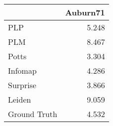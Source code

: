 \begin{tabular}{lr}
\toprule
{} & Auburn71 \\
\midrule
PLP          &    5.248 \\
PLM          &    8.467 \\
Potts        &    3.304 \\
Infomap      &    4.286 \\
Surprise     &    3.866 \\
Leiden       &    9.059 \\
Ground Truth &    4.532 \\
\bottomrule
\end{tabular}
